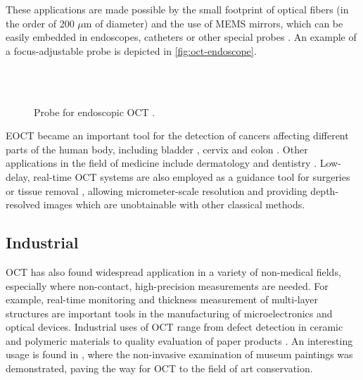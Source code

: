 These applications are made possible by the small footprint of optical fibers (in the order of 200 $\mu$m of diameter) and the use of \ac{MEMS} mirrors, which can be easily embedded in endoscopes, catheters or other special probes \citep{Tearney96,Liao2017}. An example of a focus-adjustable probe is depicted in \autoref{fig:oct-endoscope}.

\begin{figure}[hbt]
	\myfloatalign
	 \\
	\\
	\caption{Probe for endoscopic OCT \cite{Liao2017}.}\label{fig:oct-endoscope}
\end{figure}

\ac{EOCT} became an important tool for the detection of cancers affecting different parts of the human body, including bladder \citep{Xie2003}, cervix \citep{Escobar2004} and colon \citep{Hariri2006}. 
Other applications in the field of medicine include dermatology \citep{Korde2007,GAMBICHLER2005} and dentistry \citep{Amaechi2001,Machoy2017}. Low-delay, real-time OCT systems are also employed as a guidance tool for surgeries or tissue removal \cite{Boppart1999,Boppart2004}, allowing micrometer-scale resolution and providing depth-resolved images which are unobtainable with other classical methods.

\subsection{Industrial}
OCT has also found widespread application in a variety of non-medical fields, especially where non-contact, high-precision measurements are needed. For example, real-time monitoring and thickness measurement of multi-layer structures are important tools in the manufacturing of microelectronics and optical devices. Industrial uses of OCT range from defect detection in ceramic and polymeric materials \cite{Wiesauer2005,Su2014} to quality evaluation of paper products \cite{Prykari2010,Alarousu2005}. An interesting usage is found in \cite{Liang2005}, where the non-invasive examination of museum paintings was demonstrated, paving the way for OCT to the field of art conservation.

